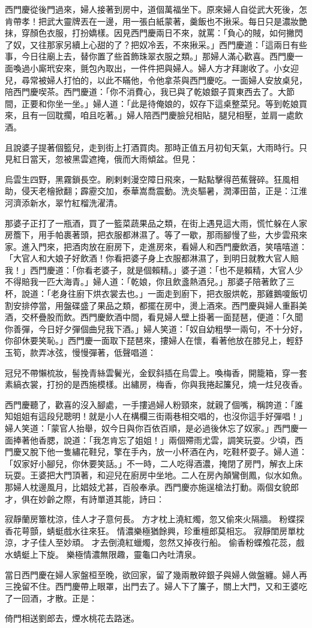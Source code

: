 西門慶從後門過來，婦人接著到房中，道個萬福坐下。原來婦人自從武大死後，怎肯帶孝！把武大靈牌丟在一邊，用一張白紙蒙著，羹飯也不揪采。每日只是濃妝艷抹，穿顏色衣服，打扮嬌樣。因見西門慶兩日不來，就罵：「負心的賊，如何撇閃了奴，又往那家另續上心甜的了？把奴冷丟，不來揪采。」西門慶道：「這兩日有些事，今日往廟上去，替你置了些首飾珠翠衣服之類。」那婦人滿心歡喜。西門慶一面喚過小廝玳安來，氈包內取出，一件件把與婦人。婦人方才拜謝收了。小女迎兒，尋常被婦人打怕的，以此不瞞他，令他拿茶與西門慶吃。一面婦人安放桌兒，陪西門慶喫茶。西門慶道：「你不消費心，我已與了乾娘銀子買東西去了。大節間，正要和你坐一坐。」婦人道：「此是待俺娘的，奴存下這桌整菜兒。等到乾娘買來，且有一回耽擱，咱且吃著。」婦人陪西門慶臉兒相貼，腿兒相壓，並肩一處飲酒。

且說婆子提著個籃兒，走到街上打酒買肉。那時正值五月初旬天氣，大雨時行。只見紅日當天，忽被黑雲遮掩，俄而大雨傾盆。但見：

烏雲生四野，黑霧鎖長空。刷剌剌漫空障日飛來，一點點擊得芭蕉聲碎。狂風相助，侵天老檜掀翻；霹靂交加，泰華嵩喬震動。洗炎驅暑，潤澤田苗，正是：江淮河濟添新水，翠竹紅榴洗濯清。

那婆子正打了一瓶酒，買了一籃菜蔬果品之類，在街上遇見這大雨，慌忙躲在人家房簷下，用手帕裹著頭，把衣服都淋濕了。等了一歇，那雨腳慢了些，大步雲飛來家。進入門來，把酒肉放在廚房下，走進房來，看婦人和西門慶飲酒，笑嘻嘻道：「大官人和大娘子好飲酒！你看把婆子身上衣服都淋濕了，到明日就教大官人賠我！」西門慶道：「你看老婆子，就是個賴精。」婆子道：「也不是賴精，大官人少不得賠我一匹大海青。」婦人道：「乾娘，你且飲盞熱酒兒。」那婆子陪著飲了三杯，說道：「老身往廚下烘衣裳去也。」一面走到廚下，把衣服烘乾，那雞鵝嗄飯切割安排停當，用盤碟盛了果品之類，都擺在房中，燙上酒來。西門慶與婦人重斟美酒，交杯疊股而飲。西門慶飲酒中間，看見婦人壁上掛著一面琵琶，便道：「久聞你善彈，今日好夕彈個曲兒我下酒。」婦人笑道：「奴自幼粗學一兩句，不十分好，你卻休要笑恥。」西門慶一面取下琵琶來，摟婦人在懷，看著他放在膝兒上，輕舒玉筍，款弄冰弦，慢慢彈著，低聲唱道：

冠兒不帶懶梳妝，髻挽青絲雲鬢光，金釵斜插在烏雲上。喚梅香，開籠箱，穿一套素縞衣裳，打扮的是西施模樣。出繡房，梅香，你與我捲起簾兒，燒一炷兒夜香。

西門慶聽了，歡喜的沒入腳處，一手摟過婦人粉頸來，就親了個嘴，稱誇道：「誰知姐姐有這段兒聰明！就是小人在構欄三街兩巷相交唱的，也沒你這手好彈唱！」 婦人笑道：「蒙官人抬舉，奴今日與你百依百順，是必過後休忘了奴家。」西門慶一面捧著他香腮，說道：「我怎肯忘了姐姐！」兩個殢雨尤雲，調笑玩耍。少頃，西門慶又脫下他一隻繡花鞋兒，擎在手內，放一小杯酒在內，吃鞋杯耍子。婦人道：「奴家好小腳兒，你休要笑話。」不一時，二人吃得酒濃，掩閉了房門，解衣上床玩耍。王婆把大門頂著，和迎兒在廚房中坐地。二人在房內顛鸞倒鳳，似水如魚。那婦人枕邊風月，比娼妓尤甚，百般奉承。西門慶亦施逞槍法打動。兩個女貌郎才，俱在妙齡之際，有詩單道其能，詩曰：

寂靜蘭房簟枕涼，佳人才子意何長。
方才枕上澆紅燭，忽又偷來火隔牆。
粉蝶探香花萼顫，蜻蜓戲水往來狂。
情濃樂極猶餘興，珍重檀郎莫相忘。
寂靜閨房單枕涼，才子佳人至妙頑。
才去倒澆紅蠟燭，忽然又掉夜行船。
偷香粉蝶飧花蕊，戲水蜻蜓上下旋。
樂極情濃無限趣，靈龜口內吐清泉。

當日西門慶在婦人家盤桓至晚，欲回家，留了幾兩散碎銀子與婦人做盤纏。婦人再三挽留不住。西門慶帶上眼罩，出門去了。婦人下了簾子，關上大門，又和王婆吃了一回酒，才散。正是：

倚門相送劉郎去，煙水桃花去路迷。


